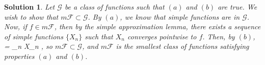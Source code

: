 \documentclass{article} %
\def\eQb#1\eQe{\begin{eqnarray*}#1\end{eqnarray*}}
\theoremstyle{quest}
\newtheorem*{solution}{Solution}
\begin{document}
\begin{solution}
\bigskip

Let $\mathscr{G}$ be a class of functions such that $(a)$ and $(b)$ are true. 
We wish to show that $m\mathscr{F} \subset \mathscr{G}$. By $(a)$, we know that
simple functions are in $\mathscr{G}$. Now, if $f \in m\mathscr{F}$, then
by the simple approximation lemma, there exists a sequence of simple functions
$\{X_n \}$ such that $X_n$ converges pointwise to $f$. Then, by $(b)$,
\eQb
f = \limsup_{n \to \infty} X_n \in {},
\eQe 
so $m\mathscr{F} \subset \mathscr{G}$, and $m\mathscr{F}$ is the smallest class
of functions satisfying properties $(a)$ and $(b)$.

\end{solution}
\newpage
\end{document}
